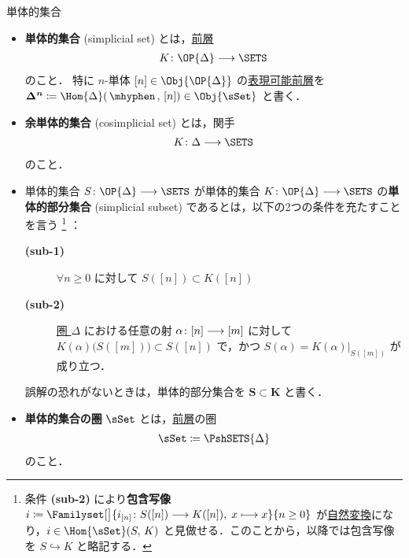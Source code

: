 \documentclass[TQFT_main]{subfiles}
\begin{document}
\begin{mydef}[label=def:SimpSet,breakable]{単体的集合}
    \begin{itemize}
        \item \textbf{単体的集合} (simplicial set)  とは，\hyperref[def:presheaf-general]{前層}
        \begin{align}
            K \colon \OP{\Delta} \lto \SETS
        \end{align}
        のこと．
        特に $n$-単体 $[n] \in \Obj{\OP{\Delta}}$ の\hyperref[def:representable]{表現可能前層}を $\bm{\Delta^n} \coloneqq \Hom{\Delta} (\, \mhyphen \,,\, [n]) \in \Obj{\sSet}$ と書く．

        \item \textbf{余単体的集合} (cosimplicial set) とは，関手
        \begin{align}
            K \colon \Delta \lto \SETS
        \end{align}
        のこと．
        \item 単体的集合 $S \colon \OP{\Delta} \lto \SETS$ が単体的集合 $K \colon \OP{\Delta} \lto \SETS$ の\textbf{単体的部分集合} (simplicial subset) であるとは，以下の2つの条件を充たすことを言う
        \footnote{条件 \textsf{\textbf{(sub-2)}} により\textbf{包含写像} $i \coloneqq \Familyset[\big]{i_{[n]} \colon S([n]) \lto K([n]),\; x \lmto x}{n \ge 0}$ が\hyperref[def:nat]{自然変換}になり，$i \in \Hom{\sSet} (S,\, K)$ と見做せる．このことから，以降では包含写像を $S \hookrightarrow K$ と略記する．}
        ：
        \begin{description}
            \item[\textbf{(sub-1)}] $\forall n \ge 0$ に対して $S([n]) \subset K([n])$
            \item[\textbf{(sub-2)}] \hyperref[def:simplex-cat]{圏 $\Delta$} における任意の射 $\alpha \colon [n] \longrightarrow [m]$ に対して $K(\alpha) \bigl( S([m]) \bigr) \subset S([n])$ で，かつ $S(\alpha) = K(\alpha)|_{S([m])}$ が成り立つ．
        \end{description}
        誤解の恐れがないときは，単体的部分集合を $\bm{S \subset K}$ と書く．
        \item \textbf{単体的集合の圏} $\sSet$ とは，\hyperref[def:presheaf-general]{前層}の圏
        \begin{align}
            \sSet \coloneqq \PshSETS{\Delta}
        \end{align}
        のこと．
    \end{itemize}

    \tcblower


\end{mydef}
\end{document}
